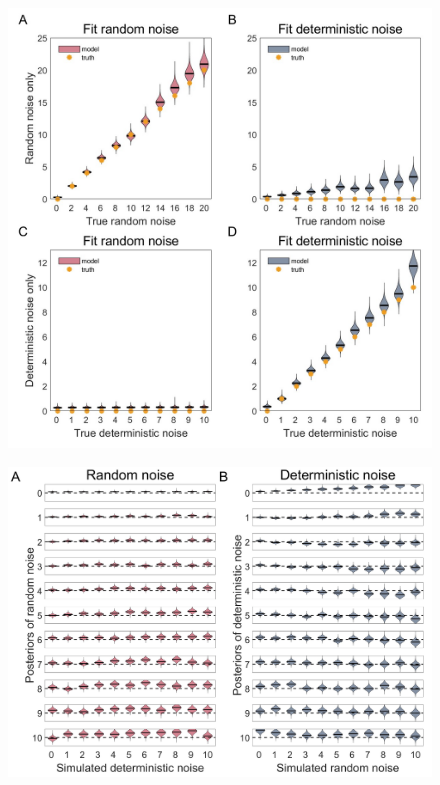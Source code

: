 \documentclass[12pt]{article}
\begin{document}
	\newpage
	\begin{figure}[H]
		\begin{center}
			\includegraphics[width=1\textwidth]{figures/RDBayes_parameterrecovery_grid_pureRanDet_R20.jpg}
			\caption{}
		\end{center}
	\end{figure}

	\newpage
	\begin{figure}[H]
		\begin{center}
			\includegraphics[width=1\textwidth]{figures/RDBayes_parameterrecovery_gridsimu_all.jpg}
			\caption{}
		\end{center}
	\end{figure}
		
\end{document}
